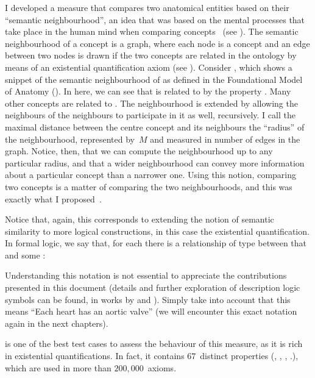 I developed a measure that compares two anatomical entities based on their ``semantic neighbourhood'', an idea that was based on the mental processes that take place in the human mind when comparing concepts~\citep{Quillian1968,Collins1975,Tversky1977} (see ). The semantic neighbourhood of a concept is a graph, where each node is a concept and an edge between two nodes is drawn if the two concepts are related in the ontology by means of an existential quantification axiom (see ). Consider , which shows a snippet of the semantic neighbourhood of  as defined in the Foundational Model of Anatomy (). In here, we can see that  is related to  by the property . Many other concepts are related to . The neighbourhood is extended by allowing the neighbours of the neighbours to participate in it as well, recursively. I call the maximal distance between the centre concept and its neighbours the ``radius'' of the neighbourhood, represented by~$M$ and measured in number of edges in the graph. Notice, then, that we can compute the neighbourhood up to any particular radius, and that a wider neighbourhood can convey more information about a particular concept than a narrower one. Using this notion, comparing two concepts is a matter of comparing the two neighbourhoods, and this was exactly what I proposed~\citep{Ferreira2011}.

Notice that, again, this corresponds to extending the notion of semantic similarity to more logical constructions, in this case the existential quantification. In formal logic, we say that, for each  there is a relationship of type  between that  and some :
\begin{axiom}
\end{axiom}
Understanding this notation is not essential to appreciate the contributions presented in this document (details and further exploration of description logic symbols can be found, \eg in works by \citet{Nardi2003} and \citet{Baader2005}). Simply take into account that this means ``Each heart has an aortic valve'' (we will encounter this exact notation again in the next chapters).

 is one of the best test cases to assess the behaviour of this measure, as it is rich in existential quantifications. In fact, it contains $67$~distinct properties (\eg {}, , , \etc.), which are used in more than $200{,}000$~axioms.

